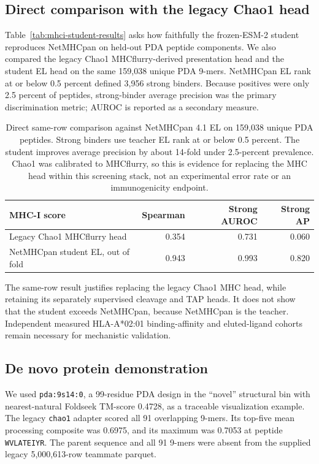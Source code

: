 \documentclass{article}
\begin{document}
\subsection{Direct comparison with the legacy Chao1 head}
Table~\ref{tab:mhci-student-results} asks how faithfully the frozen-ESM-2 student reproduces NetMHCpan on held-out PDA peptide components. We also compared the legacy Chao1 MHCflurry-derived presentation head and the student EL head on the same 159,038 unique PDA 9-mers. NetMHCpan EL rank at or below 0.5 percent defined 3,956 strong binders. Because positives were only 2.5 percent of peptides, strong-binder average precision was the primary discrimination metric; AUROC is reported as a secondary measure.

\begin{table}[t]
\centering
\small
\begin{tabular}{lrrr}
\hline
MHC-I score & Spearman & Strong AUROC & Strong AP \\
\hline
Legacy Chao1 MHCflurry head & 0.354 & 0.731 & 0.060 \\
NetMHCpan student EL, out of fold & 0.943 & 0.993 & 0.820 \\
\hline
\end{tabular}
\caption{Direct same-row comparison against NetMHCpan 4.1 EL on 159,038 unique PDA peptides. Strong binders use teacher EL rank at or below 0.5 percent. The student improves average precision by about 14-fold under 2.5-percent prevalence. Chao1 was calibrated to MHCflurry, so this is evidence for replacing the MHC head within this screening stack, not an experimental error rate or an immunogenicity endpoint.}
\label{tab:mhci-technique-comparison}
\end{table}

The same-row result justifies replacing the legacy Chao1 MHC head, while retaining its separately supervised cleavage and TAP heads. It does not show that the student exceeds NetMHCpan, because NetMHCpan is the teacher. Independent measured HLA-A*02:01 binding-affinity and eluted-ligand cohorts remain necessary for mechanistic validation.

\subsection{De novo protein demonstration}
We used \texttt{pda:9s14:0}, a 99-residue PDA design in the ``novel'' structural bin with nearest-natural Foldseek TM-score 0.4728, as a traceable visualization example. The legacy \texttt{chao1} adapter scored all 91 overlapping 9-mers. Its top-five mean processing composite was 0.6975, and its maximum was 0.7053 at peptide \texttt{WVLATEIYR}. The parent sequence and all 91 9-mers were absent from the supplied legacy 5,000,613-row teammate parquet.
\end{document}
